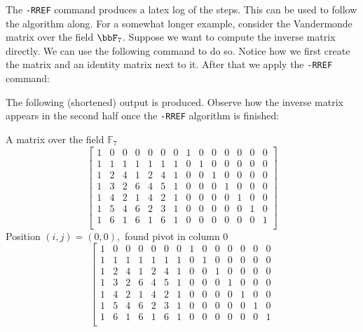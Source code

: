 \bigskip

The \verb'-RREF' command produces a latex log of the steps. 
This can be used to follow the algorithm along. 
For a somewhat longer example, consider the Vandermonde matrix over the field $\bbF_7$.
Suppose we want to compute the inverse matrix directly. We can use the following command to do so. 
Notice how we first create the matrix and an identity matrix next to it. 
After that we apply the \verb'-RREF' command:
{\tt

}
{\tt

}
The following (shortened) output is produced. Observe how the inverse matrix 
appears in the second half once the \verb'-RREF' algorithm is finished: 
\begin{mdframed}[style=MyFrame]
\noindent A matrix over the field ${\mathbb F}_{7}$\\
$$
\left[
\begin{array}{*{14}{c}}
1 & 0 & 0 & 0 & 0 & 0 & 0 & 1 & 0 & 0 & 0 & 0 & 0 & 0\\
1 & 1 & 1 & 1 & 1 & 1 & 1 & 0 & 1 & 0 & 0 & 0 & 0 & 0\\
1 & 2 & 4 & 1 & 2 & 4 & 1 & 0 & 0 & 1 & 0 & 0 & 0 & 0\\
1 & 3 & 2 & 6 & 4 & 5 & 1 & 0 & 0 & 0 & 1 & 0 & 0 & 0\\
1 & 4 & 2 & 1 & 4 & 2 & 1 & 0 & 0 & 0 & 0 & 1 & 0 & 0\\
1 & 5 & 4 & 6 & 2 & 3 & 1 & 0 & 0 & 0 & 0 & 0 & 1 & 0\\
1 & 6 & 1 & 6 & 1 & 6 & 1 & 0 & 0 & 0 & 0 & 0 & 0 & 1\\
\end{array}
\right]
$$
\noindent  Position $(i,j)=(0,0),$ found pivot in column 0\\
$$
\left[
\begin{array}{*{14}{c}}
1 & 0 & 0 & 0 & 0 & 0 & 0 & 1 & 0 & 0 & 0 & 0 & 0 & 0\\
1 & 1 & 1 & 1 & 1 & 1 & 1 & 0 & 1 & 0 & 0 & 0 & 0 & 0\\
1 & 2 & 4 & 1 & 2 & 4 & 1 & 0 & 0 & 1 & 0 & 0 & 0 & 0\\
1 & 3 & 2 & 6 & 4 & 5 & 1 & 0 & 0 & 0 & 1 & 0 & 0 & 0\\
1 & 4 & 2 & 1 & 4 & 2 & 1 & 0 & 0 & 0 & 0 & 1 & 0 & 0\\
1 & 5 & 4 & 6 & 2 & 3 & 1 & 0 & 0 & 0 & 0 & 0 & 1 & 0\\
1 & 6 & 1 & 6 & 1 & 6 & 1 & 0 & 0 & 0 & 0 & 0 & 0 & 1\\
\end{array}
$$
\end{mdframed}
